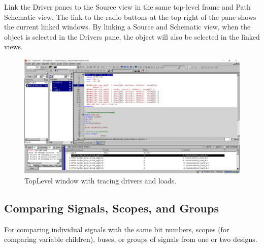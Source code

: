 \documentclass[a4paper,12pt,twoside]{article}
\begin{document}
Link the Driver panes to the Source view in the same top-level frame and Path Schematic view. The link to the radio
buttons at the top right of the pane shows the current linked windows. By linking a Source and Schematic view,
when the object is selected in the Drivers pane, the object will also be selected in the linked views.
\begin{figure}[H]
    \centering
    \includegraphics[width=\textwidth]{images/30.png}
    \caption{TopLevel window with tracing drivers and loads.}
    \label{f30}
\end{figure}
\subsection{Comparing Signals, Scopes, and Groups}\label{SComp}
For comparing individual signals with the same bit numbers, scopes (for comparing variable children), buses, or groups of
signals from one or two designs.
\end{document}

